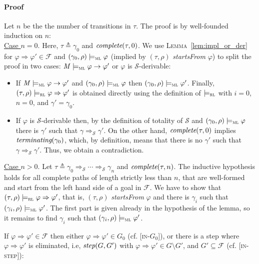 \documentclass[conference]{IEEEtran}
\newcommand{\M}{\mathit{M}}
\newcommand{\eqbydef}{\triangleq}
\newcommand{\F}{\mathcal{F}}
\renewcommand{\S}{\mathcal{S}}
\newcommand{\tran}[2]{\Ra^{\!#1}_{\!#2}}
\newcommand{\Ra}{\Rightarrow}
\renewcommand{\implies}{\rightarrow}
\newcommand{\ML}{\textsc{ml}\xspace}
\newcommand{\RL}{\textsc{rl}\xspace}
\newcommand{\rrule}[2]{{#1} \Ra{#2}}
\newcommand{\modelsml}{\models_\ML}
\newcommand{\modelsrl}{\models_\RL}
\newcommand{\coq}[1]{{\small \textit{#1}}}
\begin{document}
\paragraph{Proof} 
Let $n$ be the the number of transitions in $\tau$.
The proof is by well-founded induction on $n$:\\

\noindent
\underline{Case $n = 0$}. Here, $\tau \eqbydef \gamma_0$ and $\coq{complete}(\tau, 0)$.
We use \textsc{Lemma}~\ref{lem:impl_or_der} for $\rrule{\varphi}{\varphi'}\in\F$ and $(\gamma_0, \rho) \modelsml \varphi$  (implied by $(\tau,\rho)$ \coq{startsFrom} $\varphi$) to split the proof in two cases:  $\M \modelsml \varphi \implies \varphi'$ or $\varphi$ is $\S$-derivable: 
\begin{itemize}
\item If $\M \modelsml \varphi \implies \varphi'$ and $(\gamma_0, \rho) \modelsml \varphi$  then $(\gamma_0, \rho) \modelsml \varphi'$. 
Finally, $(\tau,\rho)\modelsrl \rrule{\varphi}{\varphi'}$ is obtained directly using the definition of $\modelsrl$ with $i = 0$, $n = 0$, and $\gamma' = \gamma_0$.
\item If $\varphi$ is $\S$-derivable then, by the definition of totality of $\S$ and $(\gamma_0, \rho) \modelsml \varphi$  there is $\gamma'$ such that $\gamma \tran{}{\S} \gamma'$. 
On the other hand, $\coq{complete}(\tau, 0)$ implies $\coq{terminating}(\gamma_0)$, which, by definition, means that there is no $\gamma'$ such that $\gamma \tran{}{\S} \gamma'$. 
Thus, we obtain a contradiction.
\end{itemize}

\noindent
\underline{Case $n > 0$}. Let $\tau \eqbydef \gamma_0 \tran{}{\S} \cdots \tran{}{\S} \gamma_n$ and $\coq{complete}(\tau, n)$.
The inductive hypothesis holds for all complete paths of length strictly less than $n$, that are well-formed and start from the left hand side of a goal in $\F$.
We have to show that $(\tau,\rho)\modelsrl \rrule{\varphi}{\varphi'}$, that is, $(\tau, \rho)$ \coq{startsFrom} $\varphi$ and there is $\gamma_i$ such that $(\gamma_i, \rho) \modelsml \varphi'$.
The first part is given already in the hypothesis of the lemma, so it remains to find $\gamma_i$ such that $(\gamma_i, \rho) \modelsml \varphi'$.

\noindent
If $\rrule{\varphi}{\varphi'} \in \F$ then either $\rrule{\varphi}{\varphi'} \in G_0$ (cf. [\textsc{in-$G_0$}]), or there is a step where $\rrule{\varphi}{\varphi'}$ is eliminated, i.e, $\coq{step}(G, G')$ with $\rrule{\varphi}{\varphi'} \in G\!\setminus\!G'$, and  $G' \subseteq \F$ (cf. [\textsc{in-step}]):
\end{document}
